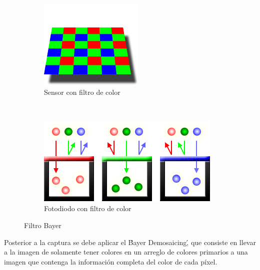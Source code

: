 \documentclass[conference]{IEEEtran}
\begin{document}
\begin{figure}[H]
\begin{subfigure}[b]{3cm}
        \includegraphics[width=\textwidth]{bayer3}
        \caption{Sensor con filtro de color}
        \label{filtered_cavity}
    \end{subfigure}
    ~ %
    \begin{subfigure}[b]{3cm}
        \includegraphics[width=\textwidth]{bayer}
        \caption{Fotodiodo con filtro de color}
        \label{fotodiodo_con_filtro}
    \end{subfigure}
    \caption{Filtro Bayer\cite{bayer}}\label{filtro_bayer}
\end{figure}

Posterior a la captura se debe aplicar el \'Bayer Demosaicing\', que consiste en llevar a la imagen de solamente tener colores en un arreglo de colores primarios a una imagen que contenga la información completa del color de cada píxel.
\end{document}
